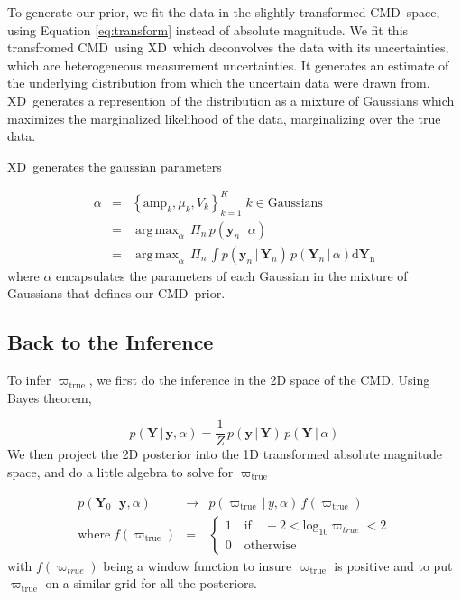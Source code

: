 \documentclass[modern]{aastex61}
\newcommand{\acronym}[1]{{\small{#1}}}
\newcommand{\xd}{\acronym{XD}}
\newcommand{\cmd}{\acronym{CMD}}
\DeclareMathOperator*{\argmax}{arg\,max}
\newcommand{\given}{\,|\,}
\newcommand{\true}{\mathrm{true}}
\begin{document}
To generate our prior, we fit the data in the slightly transformed \cmd\ space, using Equation \ref{eq:transform} instead of absolute magnitude. We fit this transfromed \cmd\ using \xd\ which deconvolves the data with its uncertainties, which are heterogeneous measurement uncertainties. It generates an estimate of the underlying distribution from which the uncertain data were drawn from. \xd\ generates a represention of the distribution as a mixture of Gaussians which maximizes the marginalized likelihood of the data, marginalizing over the true data.

\xd\ generates the gaussian parameters

\begin{eqnarray}
\alpha &=& \left\{\mathrm{amp}_k, \mu_k, V_k\right\}_{k=1}^K \; k \in \mathrm{Gaussians} \nonumber\\
       &=& \argmax_{\alpha} \, \Pi_n \, p(\mathbf{y}_n \given \alpha) \nonumber\\
       &=& \argmax_{\alpha} \, \Pi_n \, \int p(\mathbf{y}_n \given \mathbf{Y}_n) \, p(\mathbf{Y}_n \given \alpha)\mathrm{d\mathbf{Y}_n}
\label{eq:xdmml}
\end{eqnarray}
where $\alpha$ encapsulates the parameters of each Gaussian in the mixture of Gaussians that defines our \cmd\ prior.

\subsection{Back to the Inference}

To infer $\varpi_{\true}$, we first do the inference in the 2D space of the \cmd. Using Bayes theorem,

\begin{equation}
p(\mathbf{Y} \given \mathbf{y}, \alpha) = \frac{1}{Z} \, p(\mathbf{y} \given \mathbf{Y}) \, p(\mathbf{Y} \given \alpha)
\label{eq:posterior}
\end{equation}
We then project the 2D posterior into the 1D transformed absolute magnitude space, and do a little algebra to solve for $\varpi_{\true}$

\begin{eqnarray}
p(\mathbf{Y}_0 \given \mathbf{y}, \alpha) &\rightarrow& p(\varpi_{\true} \given y, \alpha) \, f(\varpi_{\true}) \\
\mathrm{where} \; f(\varpi_{\true}) &=& \begin{cases}
              1 \quad \mathrm{if} \quad -2 < \mathrm{log}_{10} \varpi_{true} < 2\\
              0 \quad \mathrm{otherwise}
              \end{cases}
\label{eq:parallaxPost}
\end{eqnarray}
with $f(\varpi_{true})$ being a window function to insure $\varpi_{\true}$ is positive and to put $\varpi_{\true}$ on a similar grid for all the posteriors.
\end{document}
